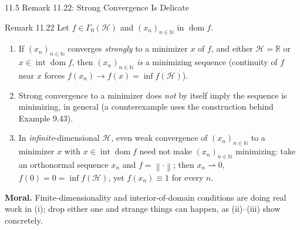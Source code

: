 \documentclass[aspectratio=169,10pt]{beamer}
\newcommand{\mHH}{\mathcal H}
\newcommand{\norm}[1]{\left\|#1\right\|}
\newcommand{\R}{\mathbb{R}}
\newcommand{\dom}{\operatorname{dom}}
\newcommand{\GamZero}{\Gamma_0(\mHH)}
\newcommand{\intr}{\operatorname{int}}
\begin{document}
\begin{frame}{11.5 Remark 11.22: Strong Convergence Is Delicate}

  \begin{block}{Remark 11.22}
    Let $f\in\GamZero$ and $(x_n)_{n\in\mathbb N}$ in $\dom f$.
    \begin{enumerate}
      \item[(i)] If $(x_n)_{n\in\mathbb N}$ converges \emph{strongly}
            to a minimizer $x$ of $f$, and either $\mHH=\R$ or
            $x\in\intr\dom f$, then $(x_n)_{n\in\mathbb N}$ \emph{is}
            a minimizing sequence (continuity of $f$ near $x$ forces
            $f(x_n)\to f(x)=\inf f(\mHH)$).
      \item[(ii)] Strong convergence to a minimizer does \emph{not}
            by itself imply the sequence is minimizing, in general
            (a counterexample uses the construction behind Example
            9.43).
      \item[(iii)] In \emph{infinite}-dimensional $\mHH$, even weak
            convergence of $(x_n)_{n\in\mathbb N}$ to a minimizer $x$
            with $x\in\intr\dom f$ need not make $(x_n)_{n\in\mathbb N}$
            minimizing: take an orthonormal sequence $x_n$ and
            $f=\norm{\cdot}$; then $x_n\rightharpoonup 0$,
            $f(0)=0=\inf f(\mHH)$, yet $f(x_n)\equiv1$ for every $n$.
    \end{enumerate}
  \end{block}

  \textbf{Moral.} Finite-dimensionality and interior-of-domain
  conditions are doing real work in (i); drop either one and strange
  things can happen, as (ii)--(iii) show concretely.

\end{frame}
\end{document}
